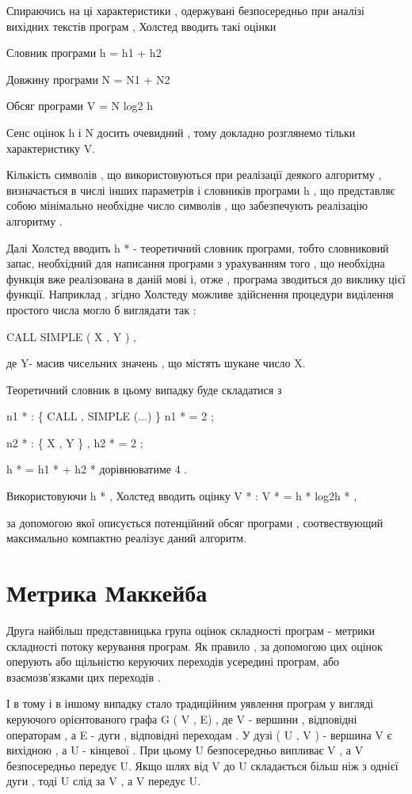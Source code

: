 Спираючись на ці характеристики , одержувані безпосередньо при аналізі вихідних текстів програм , Холстед вводить такі оцінки

Словник програми h = h1 + h2

Довжину програми N = N1 + N2

Обсяг програми V = N log2 h

Сенс оцінок h і N досить очевидний , тому докладно розглянемо тільки характеристику V.

Кількість символів , що використовуються при реалізації деякого алгоритму , визначається в числі інших параметрів і словників програми h , що представляє собою мінімально необхідне число символів , що забезпечують реалізацію алгоритму .

Далі Холстед вводить h * - теоретичний словник програми, тобто словниковий запас, необхідний для написання програми з урахуванням того , що необхідна функція вже реалізована в даній мові і, отже , програма зводиться до виклику цієї функції. Наприклад , згідно Холстеду можливе здійснення процедури виділення простого числа могло б виглядати так :

CALL SIMPLE ( X , Y ) ,

де Y- масив чисельних значень , що містять шукане число X.

Теоретичний словник в цьому випадку буде складатися з

n1 * : \{ CALL , SIMPLE (...) \} n1 * = 2 ;

n2 * : \{ X , Y \} , h2 * = 2 ;

h * = h1 * + h2 * дорівнюватиме 4 .

Використовуючи h * , Холстед вводить оцінку V * : V * = h * log2h * ,

за допомогою якої описується потенційний обсяг програми , соотвествующий максимально компактно реалізує даний алгоритм.


\section{Метрика Маккейба}
\label{2section:id11}
Друга найбільш представницька група оцінок складності програм - метрики складності потоку керування програм. Як правило , за допомогою цих оцінок оперують або щільністю керуючих переходів усередині програм, або взаємозв'язками цих переходів .

І в тому і в іншому випадку стало традиційним уявлення програм у вигляді керуючого орієнтованого графа G ( V , E) , де V - вершини , відповідні операторам , а E - дуги , відповідні переходам . У дузі ( U , V ) - вершина V є вихідною , а U - кінцевої . При цьому U безпосередньо випливає V , а V безпосередньо передує U. Якщо шлях від V до U складається більш ніж з однієї дуги , тоді U слід за V , а V передує U.

